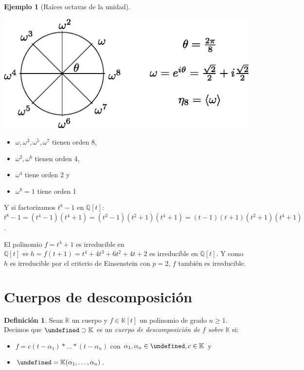 \documentclass[10pt, spanish]{report}
\theoremstyle{definition}
\newtheorem*{defin}{Definición}
\newtheorem*{ej}{Ejemplo}
\theoremstyle{custom}
\theoremstyle{remark}
\newcommand{\Q}{\mathbb{Q}}
\newcommand{\K}{\mathbb{K}}
\let\L\undefined
\newcommand{\L}{\mathbb{L}}
\renewcommand{\geq}{\geqslant}
\newcommand{\fecha}[1]{\marginpar{\underline{\footnotesize{#1}}}}
\begin{document}
\fecha{3/03}
\begin{ej}[Raíces octavas de la unidad]\hspace{2em}\vspace{1em}
    \begin{multicols}{2}

        \includegraphics[scale=0.6]{fig01.eps}
    \begin{itemize}
        \item $\omega,\omega^3,\omega^5,\omega^7$  tienen orden 8,
        \item $\omega^2,\omega^6$ tienen orden 4,
        \item $\omega^4$ tiene orden 2 y
        \item $\omega^8=1$ tiene orden 1
    \end{itemize}


    \end{multicols}

    Y si factorizamos $t^8-1$ en $\Q[t]$:
    $t^8-1=(t^4-1)(t^4+1)=(t^2-1)(t^2+1)(t^4+1)=(t-1)(t+1)(t^2+1)(t^4+1)$.

    El polinomio $f=t^4+1$ es irreducible en $\Q[t] \Leftrightarrow
    h=f(t+1)=t^4+4t^3+6t^2+4t+2$  es irreducible en $\Q[t]$. Y como $h$ es
    irreducible por el criterio de Einsenstein con $p=2$, $f$ también es
    irreducible.
\end{ej}

\section{Cuerpos de descomposición}

\begin{defin}
    Sean $\K$ un cuerpo y $f\in\K[t]$ un polinomio de grado $n\geq1$. Decimos
    que $\L\supset\K$ es un \textit{cuerpo de descomposición de $f$ sobre $\K$}
    si:
    \begin{itemize}
        \item $f=c(t-\alpha_1)*\ldots*(t-\alpha_n)$ con $\alpha_1,\alpha_n\in\L, c\in \K$
            y
        \item $\L=\K(\alpha_1,\ldots,\alpha_n)$.
    \end{itemize}
\end{defin}
\end{document}
